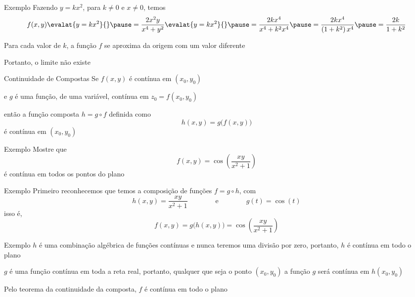 \begin{frame}{Exemplo \theexemplo}
  Fazendo \(y=kx^2\), para \(k\neq 0\) e \(x\neq 0\),
  \pause
  temos
  \[
    f(x, y)\evalat{y=kx^2}{}
    \pause
    = \frac{2x^2y}{x^4+y^2} \evalat{y=kx^2}{}
    \pause
    = \frac{2kx^4}{x^4+k^2x^4}
    \pause
    = \frac{2kx^4}{\left(1+k^2\right)x^4}
    \pause
    = \frac{2k}{1+k^2}
  \]

  \pause
  Para cada valor de $k$, a função $f$ se aproxima da origem com um valor diferente

  \pause
  Portanto, o limite não existe
\end{frame}

\begin{frame}{Continuidade de Compostas}
  Se $f(x, y)$ é contínua em $(x_0, y_0)$

  \pause
  e $g$ é uma função, de uma variável, contínua em $z_0 = f(x_0, y_0)$

  \pause
  então a função composta
  \(
    h = g\circ f
  \)
  \pause
  definida como
  \[
    h(x, y) = g\big(f(x, y)\big)
  \]
  \pause
  é contínua em $(x_0, y_0)$
\end{frame}

\addtocounter{exemplo}{1}
\begin{frame}{Exemplo \theexemplo}
  Mostre que
  \[
    f(x, y) = \cos\left(\frac{xy}{x^2+1}\right)
  \]
  é contínua em todos os pontos do plano
\end{frame}

\begin{frame}{Exemplo \theexemplo}
  Primeiro reconhecemos que temos a composição de funções $f=g\circ h$,
  \pause
  com
  \[
    h(x, y) = \frac{xy}{x^2+1}
    \qquad\qquad\text{e}\qquad\qquad
    g(t) = \cos(t)
  \]
  \pause
  isso é,
  \[
    f(x, y) = g\big(h(x, y)\big) = \cos\left(\frac{xy}{x^2+1}\right)
  \]
\end{frame}

\begin{frame}{Exemplo \theexemplo}
  $h$ é uma combinação algébrica de funções contínuas e nunca teremos
  uma divisão por zero, portanto, $h$ é contínua em todo o plano

  \pause
  \vspace{\baselineskip}
  $g$ é uma função contínua em toda a reta real, portanto, qualquer que seja o ponto
  $(x_0, y_0)$ a função $g$ será contínua em $h(x_0, y_0  )$

  \pause
  \vspace{\baselineskip}
  Pelo teorema da continuidade da composta, $f$ é contínua em todo o plano
\end{frame}

